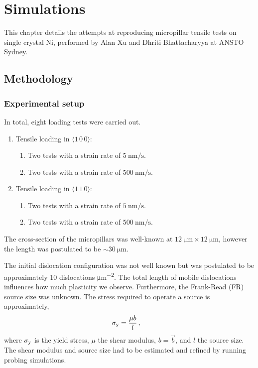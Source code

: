\chapter{Simulations}\label{c:simulations}

This chapter details the attempts at reproducing micropillar tensile tests on single crystal Ni, performed by Alan Xu and Dhriti Bhattacharyya at ANSTO Sydney.

\section{Methodology}

\subsection{Experimental setup}
\label{ss:experimentalSetup}

In total, eight loading tests were carried out.
\begin{enumerate}
    \item Tensile loading in $\langle 1\, 0\, 0 \rangle$:
          \begin{enumerate}
              \item Two tests with a strain rate of $\SI{5}{\nano\metre\per\second}$.
              \item Two tests with a strain rate of $\SI{500}{\nano\metre\per\second}$.
          \end{enumerate}
    \item Tensile loading in $\langle 1\, 1\, 0 \rangle$:
          \begin{enumerate}
              \item Two tests with a strain rate of $\SI{5}{\nano\metre\per\second}$.
              \item Two tests with a strain rate of $\SI{500}{\nano\metre\per\second}$.
          \end{enumerate}
\end{enumerate}

The cross-section of the micropillars was well-known at $\SI{12}{\micro\metre} \times \SI{12}{\micro\metre}$, however the length was postulated to be $\sim \SI{30}{\micro\metre}$.

The initial dislocation configuration was not well known but was postulated to be approximately 10 dislocations \si{\micro\metre^{-2}}. The total length of mobile dislocations influences how much plasticity we observe. Furthermore, the Frank-Read (FR) source size was unknown. The stress required to operate a source is approximately,
\begin{align}\label{eq:yieldStress}
    \sigma_{\textrm{y}} & = \dfrac{\mu b}{l}\,,
\end{align}
where $\sigma_{\textrm{y}}$ is the yield stress, $\mu$ the shear modulus, $b = \vec{b} $, and $l$ the source size. The shear modulus and source size had to be estimated and refined by running probing simulations.

